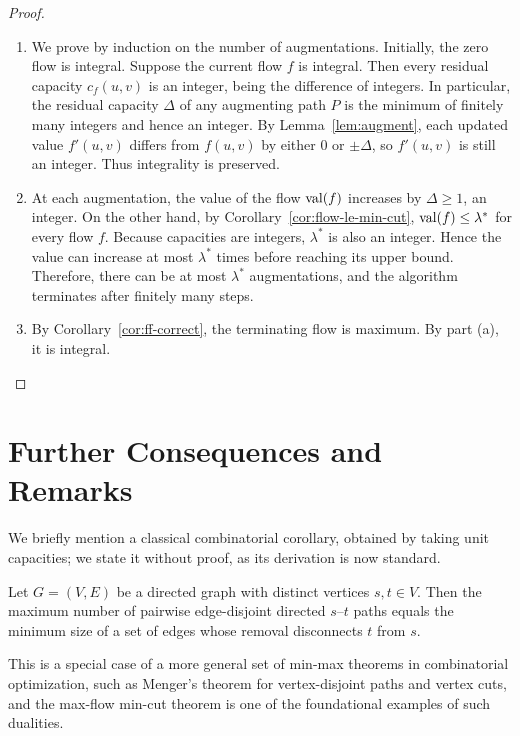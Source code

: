 \documentclass[11pt]{article}
\begin{document}
\begin{proof}
\begin{enumerate}[label=(\alph*), itemsep=0.2em]
  \item We prove by induction on the number of augmentations. Initially, the
        zero flow is integral. Suppose the current flow $f$ is integral. Then
        every residual capacity $c_f(u,v)$ is an integer, being the difference
        of integers. In particular, the residual capacity $\Delta$ of any
        augmenting path $P$ is the minimum of finitely many integers and hence
        an integer. By Lemma~\ref{lem:augment}, each updated value $f'(u,v)$
        differs from $f(u,v)$ by either $0$ or $\pm \Delta$, so $f'(u,v)$ is
        still an integer. Thus integrality is preserved.
  \item At each augmentation, the value of the flow $\mathrm{val}(f)$ increases by
        $\Delta\ge 1$, an integer. On the other hand, by
        Corollary~\ref{cor:flow-le-min-cut}, $\mathrm{val}(f)\le \lambda^*$ for every
        flow $f$. Because capacities are integers, $\lambda^*$ is also an
        integer. Hence the value can increase at most $\lambda^*$ times before
        reaching its upper bound. Therefore, there can be at most $\lambda^*$
        augmentations, and the algorithm terminates after finitely many steps.
  \item By Corollary~\ref{cor:ff-correct}, the terminating flow is maximum.
        By part (a), it is integral.
\end{enumerate}
\end{proof}

\section{Further Consequences and Remarks}

We briefly mention a classical combinatorial corollary, obtained by taking unit
capacities; we state it without proof, as its derivation is now standard.

\begin{corollary}
Let $G=(V,E)$ be a directed graph with distinct vertices $s,t\in V$. Then the
maximum number of pairwise edge-disjoint directed $s$--$t$ paths equals the
minimum size of a set of edges whose removal disconnects $t$ from $s$.
\end{corollary}

\begin{remark}
This is a special case of a more general set of min-max theorems in
combinatorial optimization, such as Menger's theorem for vertex-disjoint paths
and vertex cuts, and the max-flow min-cut theorem is one of the foundational
examples of such dualities.
\end{remark}
\end{document}
